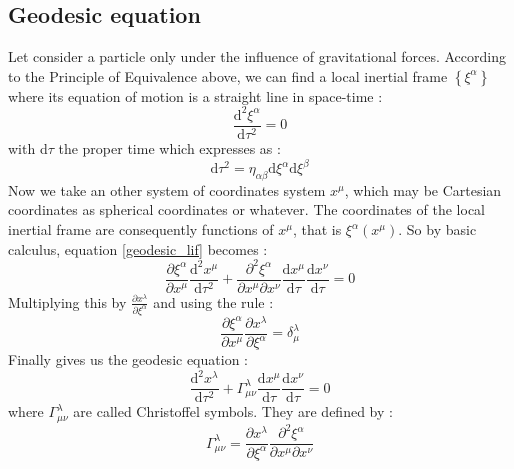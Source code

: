 \subsection{Geodesic equation}

Let consider a particle only under the influence of gravitational forces. According to the
Principle of Equivalence above, we can find a local inertial frame $\left\{\xi^\alpha\right\}$
where its equation of motion is a straight line in space-time :
%
\begin{equation}\label{geodesic_lif}
	\frac{\mathrm{d}^2\xi^\alpha}{\mathrm{d}\tau^2} = 0
\end{equation}
%
with d$\tau$ the proper time which expresses as :
%
\begin{equation}\label{proper_time1}
	\mathrm{d}\tau^2 = \eta_{\alpha\beta}\mathrm{d}\xi^\alpha\mathrm{d}\xi^\beta
\end{equation}
%
Now we take an other system of coordinates system $x^\mu$, which may be Cartesian coordinates
as spherical coordinates or whatever. The coordinates of the local inertial frame are 
consequently functions of $x^\mu$, that is $\xi^\alpha\left(x^\mu\right)$. So by basic
calculus, equation \eqref{geodesic_lif} becomes :
%
\begin{equation}
	\frac{\partial\xi^\alpha}{\partial x^\mu} \frac{\mathrm{d}^2x^\mu}{\mathrm{d}\tau^2}
	+ \frac{\partial^2\xi^\alpha}{\partial x^\mu \partial x^\nu}
	\frac{\mathrm{d}x^\mu}{\mathrm{d}\tau}\frac{\mathrm{d} x^\nu}{\mathrm{d}\tau} = 0
\end{equation}
%
Multiplying this by $\frac{\partial x^\lambda}{\partial \xi^\alpha}$ and using the rule :
%
\begin{equation}\label{product_rule}
	\frac{\partial\xi^\alpha}{\partial x^\mu}\frac{\partial x^\lambda}{\partial \xi^\alpha}
	= \delta^\lambda_\mu
\end{equation}
%
Finally gives us the geodesic equation :
%
\begin{equation}\label{formula:geodesic}
	\frac{\mathrm{d}^2x^\lambda}{\mathrm{d}\tau^2} + \Gamma^\lambda_{\mu\nu} 
	\frac{\mathrm{d}x^\mu}{\mathrm{d}\tau}\frac{\mathrm{d}x^\nu}{\mathrm{d}\tau} = 0
\end{equation}
%
where $\Gamma^\lambda_{\mu\nu}$ are called Christoffel symbols.
They are defined by :
%
\begin{equation}\label{affine_connection}
	\Gamma^\lambda_{\mu\nu} = \frac{\partial x^\lambda}{\partial \xi^\alpha}
	\frac{\partial^2\xi^\alpha}{\partial x^\mu \partial x^\nu}
\end{equation}
